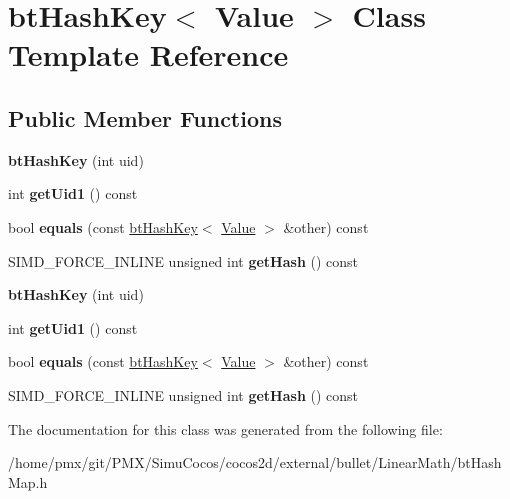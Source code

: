 \hypertarget{classbtHashKey}{}\section{bt\+Hash\+Key$<$ Value $>$ Class Template Reference}
\label{classbtHashKey}
\subsection*{Public Member Functions}
\begin{DoxyCompactItemize}
\item 
\mbox{\label{classbtHashKey_a68fa09a098d65535e9a4293af4c4669a}} 
{\bfseries bt\+Hash\+Key} (int uid)
\item 
\mbox{\label{classbtHashKey_ab492b0ca60aaedd6bdb06a98cc7421cc}} 
int {\bfseries get\+Uid1} () const
\item 
\mbox{\label{classbtHashKey_a7447383defa61db4c5dce5271fbecea8}} 
bool {\bfseries equals} (const \hyperlink{classbtHashKey}{bt\+Hash\+Key}$<$ \hyperlink{classValue}{Value} $>$ \&other) const
\item 
\mbox{\label{classbtHashKey_a68261ac1efcbcaa2e4182909475874ad}} 
S\+I\+M\+D\+\_\+\+F\+O\+R\+C\+E\+\_\+\+I\+N\+L\+I\+NE unsigned int {\bfseries get\+Hash} () const
\item 
\mbox{\label{classbtHashKey_a68fa09a098d65535e9a4293af4c4669a}} 
{\bfseries bt\+Hash\+Key} (int uid)
\item 
\mbox{\label{classbtHashKey_ab492b0ca60aaedd6bdb06a98cc7421cc}} 
int {\bfseries get\+Uid1} () const
\item 
\mbox{\label{classbtHashKey_a7447383defa61db4c5dce5271fbecea8}} 
bool {\bfseries equals} (const \hyperlink{classbtHashKey}{bt\+Hash\+Key}$<$ \hyperlink{classValue}{Value} $>$ \&other) const
\item 
\mbox{\label{classbtHashKey_a68261ac1efcbcaa2e4182909475874ad}} 
S\+I\+M\+D\+\_\+\+F\+O\+R\+C\+E\+\_\+\+I\+N\+L\+I\+NE unsigned int {\bfseries get\+Hash} () const
\end{DoxyCompactItemize}


The documentation for this class was generated from the following file\+:\begin{DoxyCompactItemize}
\item 
/home/pmx/git/\+P\+M\+X/\+Simu\+Cocos/cocos2d/external/bullet/\+Linear\+Math/bt\+Hash\+Map.\+h\end{DoxyCompactItemize}
